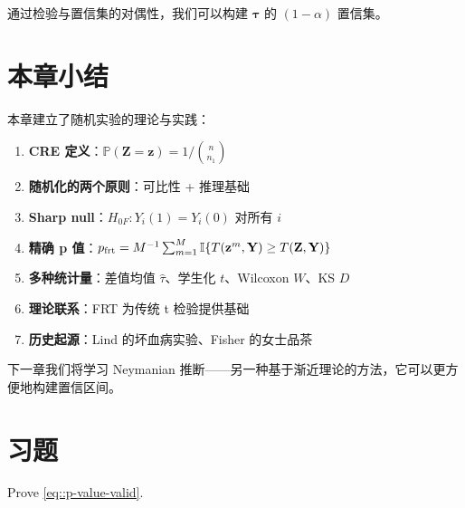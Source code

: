 通过检验与置信集的对偶性，我们可以构建 $\boldsymbol{\tau}$ 的 $(1-\alpha)$ 置信集。

\section{本章小结}

本章建立了随机实验的理论与实践：

\begin{enumerate}
  \item \textbf{CRE 定义}：$\mathbb{P}(\mathbf{Z} = \mathbf{z}) = 1 / \binom{n}{n_1}$
  \item \textbf{随机化的两个原则}：可比性 + 推理基础
  \item \textbf{Sharp null}：$H_{0F}: Y_i(1) = Y_i(0)$ 对所有 $i$
  \item \textbf{精确 p 值}：$p_{\text{frt}} = M^{-1} \sum_{m=1}^M \mathbb{I}\{T(\mathbf{z}^m, \mathbf{Y}) \geq T(\mathbf{Z}, \mathbf{Y})\}$
  \item \textbf{多种统计量}：差值均值 $\hat{\tau}$、学生化 $t$、Wilcoxon $W$、KS $D$
  \item \textbf{理论联系}：FRT 为传统 t 检验提供基础
  \item \textbf{历史起源}：Lind 的坏血病实验、Fisher 的女士品茶
\end{enumerate}

下一章我们将学习 Neymanian 推断——另一种基于渐近理论的方法，它可以更方便地构建置信区间。

\section{习题}\label{sec:3-homework}

\begin{HomeworkProblem}\label{exr:3-1}

Prove \eqref{eq::p-value-valid}.



\end{HomeworkProblem}

